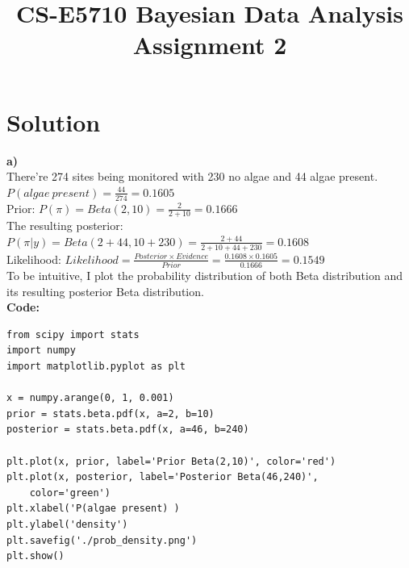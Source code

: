 \documentclass{article}
\begin{document}
\title{CS-E5710 Bayesian Data Analysis\\Assignment 2}                  
\maketitle


\section*{Solution}
\textbf{a)}\\
There're 274 sites being monitored with 230 no algae and 44 algae present.\\
 
$P(algae\ present)=\frac{44}{274}=0.1605$\\

Prior: $P(\pi)=Beta(2,10)=\frac{2}{2+10}=0.1666$\\

The resulting posterior: $P(\pi|y)=Beta(2+44, 10+230)=\frac{2+44}{2+10+44+230}=0.1608$\\

Likelihood: $Likelihood=\frac{Posterior\times Evidence}{Prior}=\frac{0.1608\times0.1605}{0.1666}=0.1549$\\

To be intuitive, I plot the probability distribution of both Beta distribution and its resulting posterior Beta distribution.\\

\textbf{Code:}
\begin{verbatim}   
from scipy import stats
import numpy
import matplotlib.pyplot as plt

x = numpy.arange(0, 1, 0.001)
prior = stats.beta.pdf(x, a=2, b=10)
posterior = stats.beta.pdf(x, a=46, b=240)

plt.plot(x, prior, label='Prior Beta(2,10)', color='red')
plt.plot(x, posterior, label='Posterior Beta(46,240)',
	color='green')
plt.xlabel('P(algae present) )
plt.ylabel('density')
plt.savefig('./prob_density.png')
plt.show()
\end{verbatim}
\end{document}
